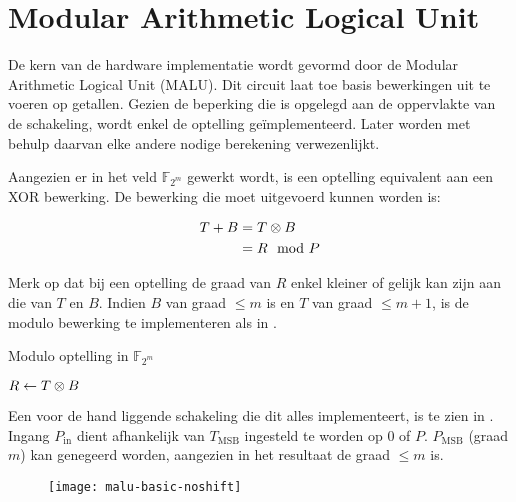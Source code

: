 \section{Modular Arithmetic Logical Unit}

De kern van de hardware implementatie wordt gevormd door de Modular Arithmetic Logical Unit (MALU)\cite{sakiyama}. Dit circuit laat toe basis bewerkingen uit te voeren op getallen. Gezien de beperking die is opgelegd aan de oppervlakte van de schakeling, wordt enkel de optelling ge\"implementeerd. Later worden met behulp daarvan elke andere nodige berekening verwezenlijkt.

Aangezien er in het veld $\mathbb{F}_{2^m}$ gewerkt wordt, is een optelling equivalent aan een XOR bewerking. De bewerking die moet uitgevoerd kunnen worden is:

\[\begin{aligned}
T + B	&= T \otimes B\\
		&= R \mod P
\end{aligned}\]

Merk op dat bij een optelling de graad van $R$ enkel kleiner of gelijk kan zijn aan die van $T$ en $B$. Indien $B$ van graad $\leq m$ is en $T$ van graad $\leq m + 1$, is de modulo bewerking te implementeren als in .

\begin{algorithm}[h]
\dontprintsemicolon
\caption{Modulo optelling in $\mathbb{F}_{2^m}$}
\label{algoritme-implementatie-malu-modulo}
$R \leftarrow T \otimes B$\;
\end{algorithm}

Een voor de hand liggende schakeling die dit alles implementeert, is te zien in . Ingang $P_{\text{in}}$ dient afhankelijk van $T_{\text{MSB}}$ ingesteld te worden op $0$ of $P$. $P_{\text{MSB}}$ (graad $m$) kan genegeerd worden, aangezien in het resultaat de graad $\leq m$ is.

\begin{figure}[h]
	\begin{center}
		\texttt{[image: malu-basic-noshift]}
		\label{figuur-implementatie-malu-basic-noshift}
	\end{center}
\end{figure}

